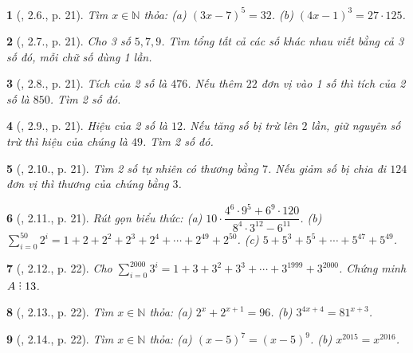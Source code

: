 \documentclass{article}
\newtheorem{baitoan}{}
\DeclareRobustCommand{\divby}{%
	\mathrel{\vbox{\baselineskip.65ex\lineskiplimit0pt\hbox{.}\hbox{.}\hbox{.}}}%
}
\begin{document}
\begin{baitoan}[\cite{Binh_boi_duong_Toan_6_tap_1}, 2.6., p. 21]
	Tìm $x\in\mathbb{N}$ thỏa: (a) $(3x - 7)^5 = 32$. (b) $(4x - 1)^3 = 27\cdot125$.
\end{baitoan}

\begin{baitoan}[\cite{Binh_boi_duong_Toan_6_tap_1}, 2.7., p. 21]
	Cho 3 số $5,7,9$. Tìm tổng tất cả các số khác nhau viết bằng cả 3 số đó, mỗi chữ số dùng 1 lần.
\end{baitoan}

\begin{baitoan}[\cite{Binh_boi_duong_Toan_6_tap_1}, 2.8., p. 21]
	Tích của 2 số là $476$. Nếu thêm $22$ đơn vị vào 1 số thì tích của 2 số là $850$. Tìm 2 số đó.
\end{baitoan}

\begin{baitoan}[\cite{Binh_boi_duong_Toan_6_tap_1}, 2.9., p. 21]
	Hiệu của 2 số là $12$. Nếu tăng số bị trừ lên $2$ lần, giữ nguyên số trừ thì hiệu của chúng là $49$. Tìm 2 số đó.
\end{baitoan}

\begin{baitoan}[\cite{Binh_boi_duong_Toan_6_tap_1}, 2.10., p. 21]
	Tìm 2 số tự nhiên có thương bằng $7$. Nếu giảm số bị chia đi $124$ đơn vị thì thương của chúng bằng $3$.
\end{baitoan}

\begin{baitoan}[\cite{Binh_boi_duong_Toan_6_tap_1}, 2.11., p. 21]
	Rút gọn biểu thức: (a) $10\cdot\dfrac{4^6\cdot9^5 + 6^9\cdot120}{8^4\cdot3^{12} - 6^{11}}$. (b) $\sum_{i=0}^{50} 2^i = 1 + 2 + 2^2 + 2^3 + 2^4 + \cdots + 2^{49} + 2^{50}$. (c) $5 + 5^3 + 5^5 + \cdots + 5^{47} + 5^{49}$.
\end{baitoan}

\begin{baitoan}[\cite{Binh_boi_duong_Toan_6_tap_1}, 2.12., p. 22]
	Cho $\sum_{i=0}^{2000} 3^i = 1 + 3 + 3^2 + 3^3 + \cdots + 3^{1999} + 3^{2000}$. Chứng minh $A\divby13$.
\end{baitoan}

\begin{baitoan}[\cite{Binh_boi_duong_Toan_6_tap_1}, 2.13., p. 22]
	Tìm $x\in\mathbb{N}$ thỏa: (a) $2^x + 2^{x + 1} = 96$. (b) $3^{4x + 4} = 81^{x + 3}$.
\end{baitoan}

\begin{baitoan}[\cite{Binh_boi_duong_Toan_6_tap_1}, 2.14., p. 22]
	Tìm $x\in\mathbb{N}$ thỏa: (a) $(x - 5)^7 = (x - 5)^9$. (b) $x^{2015} = x^{2016}$.
\end{baitoan}
\end{document}
